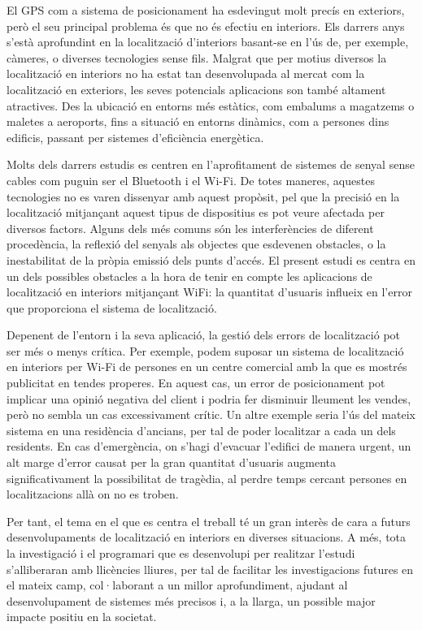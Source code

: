 
El GPS com a sistema de posicionament ha esdevingut molt precís en exteriors, però el seu principal problema és que no és efectiu en interiors. Els darrers anys s’està aprofundint en la localització d’interiors basant-se en l’ús de, per exemple, càmeres, o diverses tecnologies sense fils. Malgrat que per motius diversos la localització en interiors no ha estat tan desenvolupada al mercat com la localització en exteriors, les seves potencials aplicacions son també altament atractives. Des la ubicació en entorns més estàtics, com embalums a magatzems o maletes a aeroports, fins a situació en entorns dinàmics, com a persones dins edificis, passant per sistemes d'eficiència energètica.

Molts dels darrers estudis es centren en l’aprofitament de sistemes de senyal sense cables com puguin ser el Bluetooth i el Wi-Fi. De totes maneres, aquestes tecnologies no es varen dissenyar amb aquest propòsit, pel que la precisió en la localització mitjançant aquest tipus de dispositius es pot veure afectada per diversos factors. Alguns dels més comuns són les interferències de diferent procedència, la reflexió del senyals als objectes que esdevenen obstacles, o la inestabilitat de la pròpia emissió dels punts d'accés. El present estudi es centra en un dels possibles obstacles a la hora de tenir en compte les aplicacions de localització en interiors mitjançant WiFi: la quantitat d'usuaris influeix en l’error que proporciona el sistema de localització.

Depenent de l’entorn i la seva aplicació, la gestió dels errors de localització pot ser més o menys crítica. Per exemple, podem suposar un sistema de localització en interiors per Wi-Fi de persones en un centre comercial amb la que es mostrés publicitat en tendes properes. En aquest cas, un error de posicionament pot implicar una opinió negativa del client i podria fer disminuir lleument les vendes, però no sembla un cas excessivament crític. Un altre exemple seria l’ús del mateix sistema en una residència d’ancians, per tal de poder localitzar a cada un dels residents. En cas d’emergència, on s’hagi d’evacuar l’edifici de manera urgent, un alt marge d’error causat per la gran quantitat d'usuaris augmenta significativament la possibilitat de tragèdia, al perdre temps cercant persones en localitzacions allà on no es troben.

Per tant, el tema en el que es centra el treball té un gran interès de cara a futurs desenvolupaments de localització en interiors en diverses situacions. A més, tota la investigació i el programari que es desenvolupi per realitzar l’estudi s’alliberaran amb llicències lliures, per tal de facilitar les investigacions futures en el mateix camp, col·laborant a un millor aprofundiment, ajudant al desenvolupament de sistemes més precisos i, a la llarga, un possible major impacte positiu en la societat.

